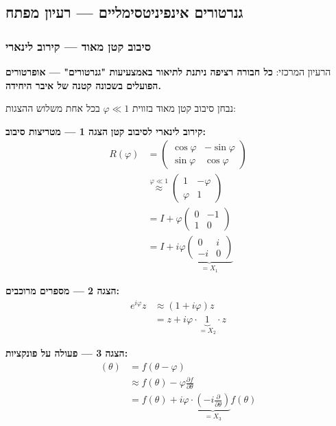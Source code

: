 \subsection{גנרטורים אינפיניטסימליים — רעיון מפתח}

\subsubsection{סיבוב קטן מאוד — קירוב לינארי}

הרעיון המרכזי: \textbf{כל חבורה רציפה ניתנת לתיאור באמצעיעות "גנרטורים" — אופרטורים הפועלים בשכונה קטנה של איבר היחידה.}

נבחן סיבוב קטן מאוד בזווית $\varphi \ll 1$ בכל אחת משלוש ההצגות:

\textbf{קירוב לינארי לסיבוב קטן}
\textbf{הצגה 1 — מטריצות סיבוב:}
\begin{align*}
R(\varphi) &= \begin{pmatrix}
\cos\varphi & -\sin\varphi \\
\sin\varphi & \cos\varphi
\end{pmatrix} \\
&\stackrel{\varphi \ll 1}{\approx} \begin{pmatrix}
1 & -\varphi \\
\varphi & 1
\end{pmatrix} \\
&= I + \varphi \begin{pmatrix}
0 & -1 \\
1 & 0
\end{pmatrix} \\
&= I + i\varphi \underbrace{\begin{pmatrix}
0 & i \\
-i & 0
\end{pmatrix}}_{=X_1}
\end{align*}

\textbf{הצגה 2 — מספרים מרוכבים:}
\begin{align*}
e^{i\varphi} z &\approx (1 + i\varphi) z \\
&= z + i\varphi \cdot \underbrace{1}_{=X_2} \cdot z
\end{align*}

\textbf{הצגה 3 — פעולה על פונקציות:}
\begin{align*}
[T(\varphi) f](\theta) &= f(\theta - \varphi) \\
&\approx f(\theta) - \varphi \frac{\partial f}{\partial \theta} \\
&= f(\theta) + i\varphi \cdot \underbrace{\left(-i\frac{\partial}{\partial\theta}\right)}_{=X_3} f(\theta)
\end{align*}

